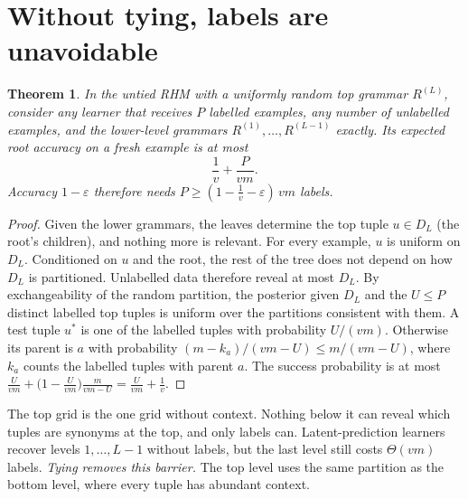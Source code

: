 \documentclass[11pt]{article}
\newtheorem{theorem}{Theorem}
\theoremstyle{definition}
\begin{document}
\section{Without tying, labels are unavoidable}
\begin{theorem}\label{thm:lower}
In the untied RHM with a uniformly random top grammar $R^{(L)}$, consider any learner that
receives $P$ labelled examples, any number of unlabelled examples, and the lower-level grammars
$R^{(1)},\dots,R^{(L-1)}$ exactly. Its expected root accuracy on a fresh example is at most
\[
\frac1v+\frac{P}{vm}.
\]
Accuracy $1-\varepsilon$ therefore needs $P\ge(1-\tfrac1v-\varepsilon)\,vm$ labels.
\end{theorem}
\begin{proof}
Given the lower grammars, the leaves determine the top tuple $u\in D_L$ (the root's children),
and nothing more is relevant. For every example, $u$ is uniform on $D_L$. Conditioned on $u$
and the root, the rest of the tree does not depend on how $D_L$ is partitioned. Unlabelled data
therefore reveal at most $D_L$. By exchangeability of the random partition, the posterior given
$D_L$ and the $U\le P$ distinct labelled top tuples is uniform over the partitions consistent
with them. A test tuple $u^*$ is one of the labelled tuples with probability $U/(vm)$. Otherwise
its parent is $a$ with probability $(m-k_a)/(vm-U)\le m/(vm-U)$, where $k_a$ counts the labelled
tuples with parent $a$. The success probability is at most
$\frac{U}{vm}+\big(1-\frac{U}{vm}\big)\frac{m}{vm-U}=\frac{U}{vm}+\frac1v$.
\end{proof}
\noindent The top grid is the one grid without context. Nothing below it can reveal which
tuples are synonyms at the top, and only labels can. Latent-prediction learners
\cite{korchinski2026} recover levels $1,\dots,L-1$ without labels, but the last level still
costs $\Theta(vm)$ labels. \emph{Tying removes this barrier.} The top level uses the same
partition as the bottom level, where every tuple has abundant context.

\end{document}
